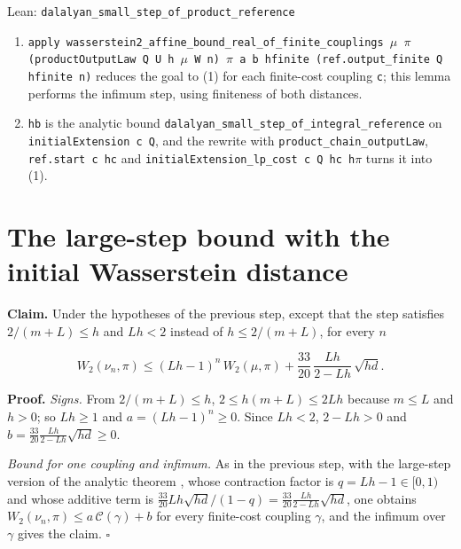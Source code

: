 \documentclass[11pt,a4paper]{article}
\begin{document}
\begin{leanbox}{Lean: \texttt{dalalyan\_\allowbreak{}small\_\allowbreak{}step\_\allowbreak{}of\_\allowbreak{}product\_\allowbreak{}reference}}
\begin{enumerate}
\item \texttt{apply wasserstein2\_\allowbreak{}affine\_\allowbreak{}bound\_\allowbreak{}real\_\allowbreak{}of\_\allowbreak{}finite\_\allowbreak{}couplings \ensuremath{\mu} \ensuremath{\pi} (product\allowbreak{}Output\allowbreak{}Law Q U h \ensuremath{\mu} W n) \ensuremath{\pi} a b hfinite (ref.\allowbreak{}output\_\allowbreak{}finite Q hfinite n)} reduces the goal to (1) for each finite-cost coupling \texttt{c}; this lemma performs the infimum step, using finiteness of both distances.

\item \texttt{hb} is the analytic bound \texttt{dalalyan\_\allowbreak{}small\_\allowbreak{}step\_\allowbreak{}of\_\allowbreak{}integral\_\allowbreak{}reference} on \texttt{initial\allowbreak{}Extension c Q}, and the rewrite with \texttt{product\_\allowbreak{}chain\_\allowbreak{}output\allowbreak{}Law}, \texttt{ref.\allowbreak{}start c hc} and \texttt{initial\allowbreak{}Extension\_\allowbreak{}lp\_\allowbreak{}cost c Q hc h\ensuremath{\pi}} turns it into (1).

\end{enumerate}
\end{leanbox}

\section{\texorpdfstring{The large-step bound with the initial Wasserstein distance}{The large-step bound with the initial Wasserstein distance}}


\textbf{Claim.} Under the hypotheses of the previous step, except that the step satisfies \(2/(m+L)\le h\) and \(Lh<2\) instead of \(h\le2/(m+L)\), for every \(n\)


\[W_2(\nu_n,\pi)\le(Lh-1)^n\,W_2(\mu,\pi)+\frac{33}{20}\,\frac{Lh}{2-Lh}\,\sqrt{hd}.\]


\textbf{Proof.} \emph{Signs.} From \(2/(m+L)\le h\), \(2\le h(m+L)\le2Lh\) because \(m\le L\) and \(h>0\); so \(Lh\ge1\) and \(a=(Lh-1)^n\ge0\). Since \(Lh<2\), \(2-Lh>0\) and \(b=\frac{33}{20}\frac{Lh}{2-Lh}\sqrt{hd}\ge0\).




\emph{Bound for one coupling and infimum.} As in the previous step, with the large-step version of the analytic theorem \cite[Section~3.19.6]{LangevinLean2026ULASC}, whose contraction factor is \(q=Lh-1\in[0,1)\) and whose additive term is \(\frac{33}{20}Lh\sqrt{hd}/(1-q)=\frac{33}{20}\frac{Lh}{2-Lh}\sqrt{hd}\), one obtains \(W_2(\nu_n,\pi)\le a\,\mathcal C(\gamma)+b\) for every finite-cost coupling \(\gamma\), and the infimum over \(\gamma\) gives the claim. \(\square\)
\end{document}
